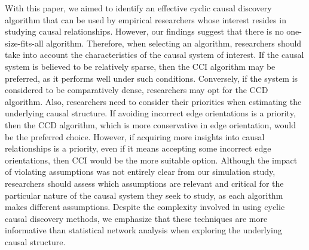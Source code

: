 \documentclass[twoside, 11pt]{article}
\begin{document}
With this paper, we aimed to identify an effective cyclic causal discovery algorithm that can be used by empirical researchers whose interest resides in studying causal relationships. However, our findings suggest that there is no one-size-fits-all algorithm.
Therefore, when selecting an algorithm, researchers should take into account the characteristics of the causal system of interest.
If the causal system is believed to be relatively sparse, then the CCI algorithm may be preferred, as it performs well under such conditions. Conversely, if the system is considered to be comparatively dense, researchers may opt for the CCD algorithm.
Also, researchers need to consider their priorities when estimating the underlying causal structure. If avoiding incorrect edge orientations is a priority, then the CCD algorithm, which is more conservative in edge orientation, would be the preferred choice. However, if acquiring more insights into causal relationships is a priority, even if it means accepting some incorrect edge orientations, then CCI would be the more suitable option. Although the impact of violating assumptions was not entirely clear from our simulation study, researchers should assess which assumptions are relevant and critical for the particular nature of the causal system they seek to study, as each algorithm makes different assumptions. Despite the complexity involved in using cyclic causal discovery methods, we emphasize that these techniques are more informative than statistical network analysis when exploring the underlying causal structure. 

\end{document}
